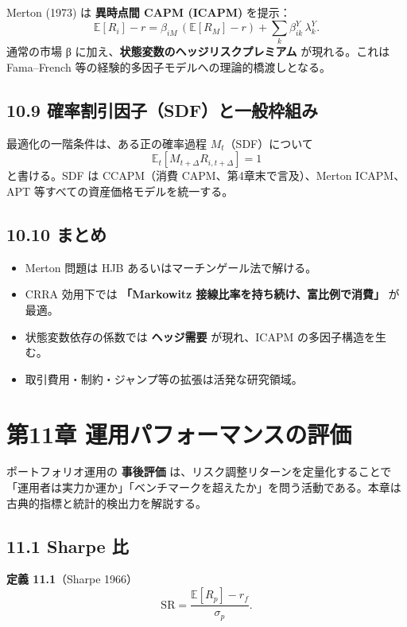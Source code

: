 \documentclass[11pt,a4paper]{report}
\begin{document}
Merton (1973) は \textbf{異時点間 CAPM (ICAPM)} を提示： \[ \mathbb{E}[R_i] - r = \beta_{iM}\, (\mathbb{E}[R_M] - r) + \sum_k \beta_{ik}^Y\, \lambda_k^Y. \] 通常の市場 β に加え、\textbf{状態変数のヘッジリスクプレミアム} が現れる。これは Fama–French 等の経験的多因子モデルへの理論的橋渡しとなる。

\section{10.9 確率割引因子（SDF）と一般枠組み}

最適化の一階条件は、ある正の確率過程 $M_t$（SDF）について \[ \mathbb{E}_t[M_{t+\Delta} R_{i,t+\Delta}] = 1 \] と書ける。SDF は CCAPM（消費 CAPM、第4章末で言及）、Merton ICAPM、APT 等すべての資産価格モデルを統一する。

\section{10.10 まとめ}

\begin{itemize}
\item Merton 問題は HJB あるいはマーチンゲール法で解ける。
\item CRRA 効用下では \textbf{「Markowitz 接線比率を持ち続け、富比例で消費」} が最適。
\item 状態変数依存の係数では \textbf{ヘッジ需要} が現れ、ICAPM の多因子構造を生む。
\item 取引費用・制約・ジャンプ等の拡張は活発な研究領域。
\end{itemize}

\noindent\hrulefill

\chapter{第11章 運用パフォーマンスの評価}

ポートフォリオ運用の \textbf{事後評価} は、リスク調整リターンを定量化することで「運用者は実力か運か」「ベンチマークを超えたか」を問う活動である。本章は古典的指標と統計的検出力を解説する。

\section{11.1 Sharpe 比}

\textbf{定義 11.1}（Sharpe 1966） \[ \mathrm{SR} = \frac{\mathbb{E}[R_p] - r_f}{\sigma_p}. \]
\end{document}
